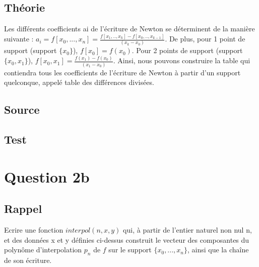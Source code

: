 \documentclass[a4paper,10pt]{report}
\begin{document}
\subsection*{Théorie}

Les différents coefficients ai de l’écriture de Newton se déterminent de la manière suivante : $a_{i} = f[x_{0},...,x_{n}] = \frac{f[x_{1},..,x_{k}]-f[x_{0},..,x_{k-1}]}{(x_{k}-x_{0})}$.
De plus, pour 1 point de support (support $\lbrace x_{0} \rbrace$), $f[x_{0}] = f(x_{0})$.
Pour 2 points de support (support $\lbrace x_{0},x_{1} \rbrace$), $f[x_{0},x_{1}] = \frac{f(x_{1})-f(x_{0})}{(x_{1}-x_{0})}$.
Ainsi, nous pouvons construire la table qui contiendra tous les coefficients de l’écriture de Newton à partir d’un support quelconque, appelé table des différences divisées.

\newpage
\subsection*{Source}

\begin{center}
%	
\end{center}

\subsection*{Test}

\begin{center}
%	
\end{center}

\section*{Question 2b}

\subsection*{Rappel}

Ecrire une fonction $interpol(n, x, y)$ qui, à partir de l’entier naturel non
nul n, et des données x et y définies ci-dessus construit le vecteur des
composantes du polynôme d’interpolation $p_{n}$ de $f$ sur le support $\lbrace  x_{0},...,x_{n} \rbrace$,
ainsi que la chaîne de son écriture.
\end{document}
